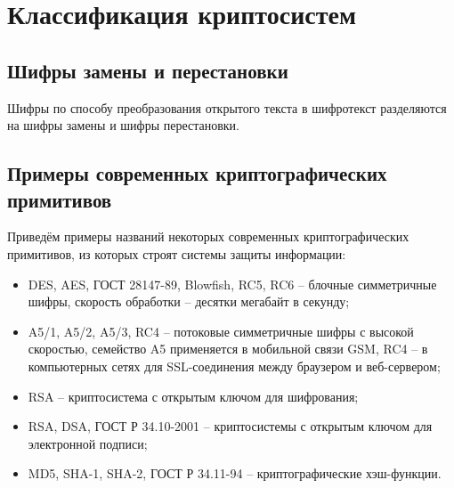 

\section{Классификация криптосистем}



\subsection{Шифры замены и перестановки}

Шифры по способу преобразования открытого текста в шифротекст разделяются на шифры замены и шифры перестановки.







\subsection{Примеры современных криптографических примитивов}

Приведём примеры названий некоторых современных криптографических примитивов, из которых строят системы защиты информации:
\begin{itemize}
    \item DES, AES, ГОСТ 28147-89, Blowfish, RC5, RC6 -- блочные симметричные шифры, скорость обработки -- десятки мегабайт в секунду;
    \item A5/1, A5/2, A5/3, RC4 -- потоковые симметричные шифры с высокой скоростью, семейство A5 применяется в мобильной связи GSM, RC4 -- в компьютерных сетях для SSL-соединения между браузером и веб-сервером;
    \item RSA -- криптосистема с открытым ключом для шифрования;
    \item RSA, DSA, ГОСТ Р 34.10-2001 -- криптосистемы с открытым ключом для электронной подписи;
    \item MD5, SHA-1, SHA-2, ГОСТ Р 34.11-94 -- криптографические хэш-функции.
\end{itemize}




